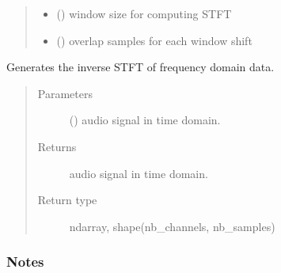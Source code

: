 \documentclass[letterpaper,10pt,english,openany,oneside]{sphinxmanual}
\begin{document}
\begin{fulllineitems}
\begin{fulllineitems}
\begin{quote}
\begin{description}
\begin{itemize}
\item {} 
 () \textendash{} window size for computing STFT

\item {} 
 () \textendash{} overlap samples for each window shift

\end{itemize}

\end{description}\end{quote}

\end{fulllineitems}


\begin{fulllineitems}
\label{\detokenize{docs/source/preprocess:preprocess.preprocess_tools.STFT.istft}}
Generates the inverse STFT of frequency domain data.
\begin{quote}\begin{description}
\item[{Parameters}] \leavevmode
{} (\sphinxstyleliteralemphasis{\sphinxupquote{, }}\sphinxstyleliteralemphasis{\sphinxupquote{(}}\sphinxstyleliteralemphasis{\sphinxupquote{, }}\sphinxstyleliteralemphasis{\sphinxupquote{, }}\sphinxstyleliteralemphasis{\sphinxupquote{)}}) \textendash{} audio signal in time domain.

\item[{Returns}] \leavevmode
{} \textendash{} audio signal in time domain.

\item[{Return type}] \leavevmode
ndarray, shape(nb\_channels, nb\_samples)

\end{description}\end{quote}
\subsubsection*{Notes}


\end{fulllineitems}
\end{fulllineitems}
\end{document}
